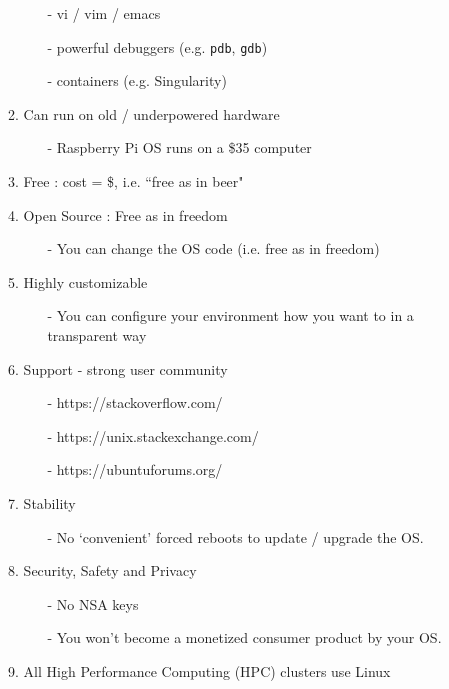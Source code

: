 \documentclass{beamer}
\newcommand{\code}[1]{\colorbox{codegray}{\texttt{#1}}}
\begin{document}
\begin{frame}
\begin{itemize}
\begin{enumerate}
\begin{itemize}
            \item[-] vi / vim / emacs
            \pause
            \item[-] powerful debuggers (e.g. \code{pdb}, \code{gdb})
            \pause
            \item[-] containers (e.g. Singularity)
        \end{itemize}
        \pause
        \item Can run on old / underpowered hardware
        \begin{itemize}
            \item[-] Raspberry Pi OS runs on a \$35 computer
        \end{itemize}
        \pause
        \item Free : cost = \$, i.e. ``free as in beer"
        \pause
        \item Open Source : Free as in freedom 
        \begin{itemize}
            \item[-] You can change the OS code (i.e. free as in freedom)
        \end{itemize}
        \pause
        \item Highly customizable
        \begin{itemize}
            \item[-] You can configure your environment how you want to in a transparent way
        \end{itemize}
        \pause
        \item Support - strong user community
        \begin{itemize}
            \item[-] https://stackoverflow.com/
            \pause
            \item[-] https://unix.stackexchange.com/
            \pause
            \item[-] https://ubuntuforums.org/
        \end{itemize}
        \pause
        \item Stability
        \begin{itemize}
            \item[-] No `convenient' forced reboots to update / upgrade the OS.
        \end{itemize}
        \item Security, Safety and Privacy
        \begin{itemize}
            \item[-] No NSA keys
            \item[-] You won't become a monetized consumer product by your OS.
        \end{itemize}
        \item All High Performance Computing (HPC) clusters use Linux
    \end{enumerate}
\end{itemize}
\end{frame}
\end{document}

